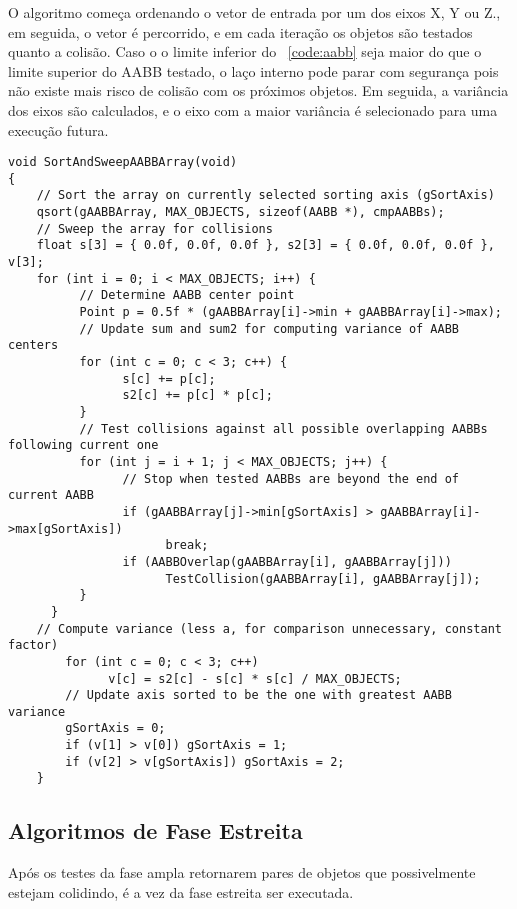 O algoritmo começa ordenando o vetor de entrada por um dos eixos X, Y ou Z., em
seguida, o vetor é percorrido, e em cada iteração os objetos são testados
quanto a colisão. Caso o o limite inferior do ~\ref{code:aabb} seja maior do
que o limite superior do AABB testado, o laço interno pode parar com segurança
pois não existe mais risco de colisão com os próximos objetos. Em seguida, a
variância dos eixos são calculados, e o eixo com a maior variância é
selecionado para uma execução futura.

\begin{lstlisting}[frame=single,caption=Exemplo de ordenar e varrer\label{code:SortAndSweep}]
void SortAndSweepAABBArray(void)
{
    // Sort the array on currently selected sorting axis (gSortAxis)
    qsort(gAABBArray, MAX_OBJECTS, sizeof(AABB *), cmpAABBs);
    // Sweep the array for collisions
    float s[3] = { 0.0f, 0.0f, 0.0f }, s2[3] = { 0.0f, 0.0f, 0.0f }, v[3];
    for (int i = 0; i < MAX_OBJECTS; i++) {
          // Determine AABB center point
          Point p = 0.5f * (gAABBArray[i]->min + gAABBArray[i]->max);
          // Update sum and sum2 for computing variance of AABB centers
          for (int c = 0; c < 3; c++) {
                s[c] += p[c];
                s2[c] += p[c] * p[c];
          }
          // Test collisions against all possible overlapping AABBs following current one
          for (int j = i + 1; j < MAX_OBJECTS; j++) {
                // Stop when tested AABBs are beyond the end of current AABB
                if (gAABBArray[j]->min[gSortAxis] > gAABBArray[i]->max[gSortAxis])
                      break;
                if (AABBOverlap(gAABBArray[i], gAABBArray[j]))
                      TestCollision(gAABBArray[i], gAABBArray[j]);
          }
      }
    // Compute variance (less a, for comparison unnecessary, constant factor)
        for (int c = 0; c < 3; c++)
              v[c] = s2[c] - s[c] * s[c] / MAX_OBJECTS;
        // Update axis sorted to be the one with greatest AABB variance
        gSortAxis = 0;
        if (v[1] > v[0]) gSortAxis = 1;
        if (v[2] > v[gSortAxis]) gSortAxis = 2;
    }
\end{lstlisting}

\subsection{Algoritmos de Fase Estreita}

Após  os testes da fase ampla retornarem pares de objetos que possivelmente
estejam colidindo, é a vez da fase estreita ser executada.

